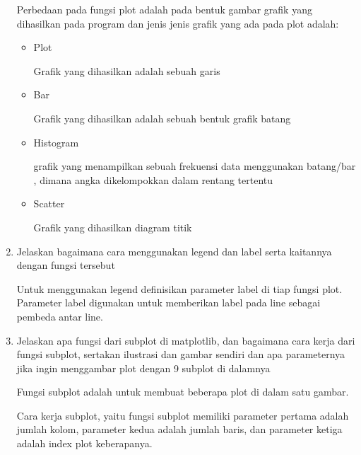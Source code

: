 \begin{enumerate}
Perbedaan pada fungsi plot adalah pada bentuk gambar grafik yang dihasilkan pada program dan jenis jenis grafik yang ada pada plot adalah:
\begin{itemize}
	\item Plot

	Grafik yang dihasilkan adalah sebuah garis 
	

	\item Bar

	Grafik yang dihasilkan adalah sebuah bentuk grafik batang
	

	\item Histogram

	grafik yang menampilkan sebuah frekuensi data menggunakan batang/bar , dimana angka dikelompokkan dalam rentang tertentu
	

	\item Scatter

	Grafik yang dihasilkan diagram titik 
	
\end{itemize}

	\item  Jelaskan bagaimana cara menggunakan legend dan label serta kaitannya dengan fungsi tersebut

	Untuk menggunakan legend definisikan parameter label di tiap fungsi plot. Parameter label digunakan untuk memberikan label pada line sebagai pembeda antar line.
	
	
	\item Jelaskan apa fungsi dari subplot di matplotlib, dan bagaimana cara kerja dari fungsi subplot, sertakan ilustrasi dan gambar sendiri dan apa parameternya jika ingin menggambar plot dengan 9 subplot di dalamnya
	
	\par Fungsi subplot adalah untuk membuat beberapa plot di dalam satu gambar.
	\par Cara kerja subplot, yaitu fungsi subplot memiliki parameter pertama adalah jumlah kolom, parameter kedua adalah jumlah baris, dan parameter ketiga adalah index plot keberapanya.	
	
	
	

\end{enumerate}
